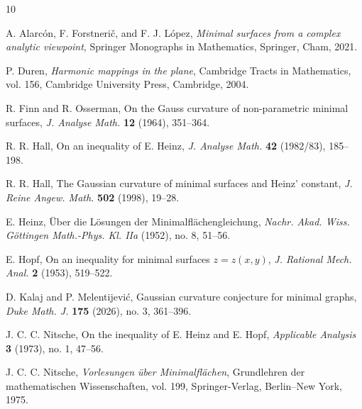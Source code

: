 \documentclass[11pt]{amsart}
\theoremstyle{remark}
\numberwithin{equation}{section}
\begin{document}
\begin{thebibliography}{10}

A. Alarc\'on, F. Forstneri\v c, and F. J. L\'opez,
\emph{Minimal surfaces from a complex analytic viewpoint},
Springer Monographs in Mathematics, Springer, Cham, 2021.

P. Duren,
\emph{Harmonic mappings in the plane},
Cambridge Tracts in Mathematics, vol. 156, Cambridge University Press, Cambridge, 2004.

R. Finn and R. Osserman,
On the Gauss curvature of non-parametric minimal surfaces,
\emph{J. Analyse Math.} \textbf{12} (1964), 351--364.

R. R. Hall,
On an inequality of E. Heinz,
\emph{J. Analyse Math.} \textbf{42} (1982/83), 185--198.

R. R. Hall,
The Gaussian curvature of minimal surfaces and Heinz' constant,
\emph{J. Reine Angew. Math.} \textbf{502} (1998), 19--28.

E. Heinz,
\"Uber die L\"osungen der Minimalfl\"achengleichung,
\emph{Nachr. Akad. Wiss. G\"ottingen Math.-Phys. Kl. IIa} (1952), no. 8, 51--56.

E. Hopf,
On an inequality for minimal surfaces $z=z(x,y)$,
\emph{J. Rational Mech. Anal.} \textbf{2} (1953), 519--522.

D. Kalaj and P. Melentijevi\'c,
Gaussian curvature conjecture for minimal graphs,
\emph{Duke Math. J.} \textbf{175} (2026), no. 3, 361--396.

J. C. C. Nitsche,
On the inequality of E. Heinz and E. Hopf,
\emph{Applicable Analysis} \textbf{3} (1973), no. 1, 47--56.

J. C. C. Nitsche,
\emph{Vorlesungen \"uber Minimalfl\"achen},
Grundlehren der mathematischen Wissenschaften, vol. 199, Springer-Verlag, Berlin--New York, 1975.

\end{thebibliography}
\end{document}
